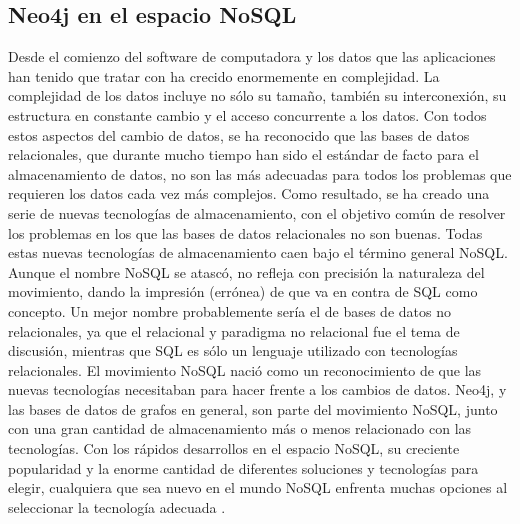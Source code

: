 \subsection{Neo4j en el espacio NoSQL}
Desde el comienzo del software de computadora y los datos que las aplicaciones han tenido que tratar con ha crecido enormemente en complejidad. La complejidad de los datos incluye no sólo su tamaño, también su interconexión, su estructura en constante cambio y el acceso concurrente a los datos.
Con todos estos aspectos del cambio de datos, se ha reconocido que las bases de datos relacionales, que durante mucho tiempo han sido el estándar de facto para el almacenamiento de datos, no son las más adecuadas para todos los problemas que requieren los datos cada vez más complejos. Como resultado, se ha creado una serie de nuevas tecnologías de almacenamiento, con el objetivo común de resolver
los problemas en los que las bases de datos relacionales no son buenas. Todas estas nuevas tecnologías de almacenamiento caen bajo el término general NoSQL.\\
Aunque el nombre NoSQL se atascó, no refleja con precisión la naturaleza
del movimiento, dando la impresión (errónea) de que va en contra de SQL como concepto. Un mejor nombre probablemente sería el de bases de datos no relacionales, ya que el relacional y paradigma no relacional fue el tema de discusión, mientras que SQL es sólo un lenguaje utilizado con tecnologías relacionales.
El movimiento NoSQL nació como un reconocimiento de que las nuevas tecnologías necesitaban para hacer frente a los cambios de datos. Neo4j, y las bases de datos de grafos en general, son parte del movimiento NoSQL, junto con una gran cantidad de almacenamiento más o menos relacionado con las tecnologías.
Con los rápidos desarrollos en el espacio NoSQL, su creciente popularidad y la enorme cantidad de diferentes soluciones y tecnologías para elegir, cualquiera que sea nuevo en el mundo NoSQL enfrenta muchas opciones al seleccionar la tecnología adecuada \cite{vukotic2015neo4j}. 
